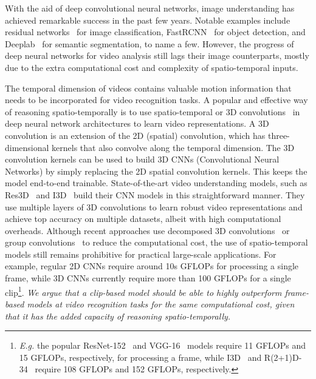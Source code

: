 \documentclass[runningheads]{llncs}
\begin{document}
With the aid of deep convolutional neural networks, image understanding has achieved remarkable success in the past few years. Notable examples include residual networks~\cite{he2016deep} for image classification, FastRCNN~\cite{girshick2015fast} for object detection, and Deeplab~\cite{chen2016deeplab} for semantic segmentation, to name a few. However, the progress of deep neural networks for video analysis still lags their image counterparts, mostly due to the extra computational cost and complexity of spatio-temporal inputs.

The temporal dimension of videos contains valuable motion information that needs to be incorporated for video recognition tasks.
A popular and effective way of reasoning spatio-temporally is to use spatio-temporal or 3D convolutions~\cite{karpathy2014large,tran2015learning} in deep neural network architectures to learn video representations.
A 3D convolution is an extension of the 2D (spatial) convolution, which has three-dimensional kernels that also convolve along the temporal dimension. The 3D convolution kernels can be used to build 3D CNNs (Convolutional Neural Networks) by simply replacing the 2D spatial convolution kernels. This keeps the model end-to-end trainable. State-of-the-art video understanding models, such as Res3D~\cite{tran2015learning} and I3D~\cite{carreira2017quo} build their CNN models in this straightforward manner. They use multiple layers of 3D convolutions to learn robust video representations and achieve top accuracy on multiple datasets, albeit with high computational overheads. Although recent approaches use decomposed 3D convolutions~\cite{tran2017closer,xie2017rethinking} or group convolutions~\cite{hara2018can} to reduce the computational cost, the use of spatio-temporal models still remains  prohibitive for practical large-scale applications. 
For example, regular 2D CNNs require around 10s GFLOPs for processing a single frame, while 3D CNNs currently require more than 100 GFLOPs for a single clip\footnote{\emph{E.g.} the popular ResNet-152~\cite{he2016deep} and VGG-16~\cite{simonyan2014very} models require 11 GFLOPs and 15 GFLOPs, respectively, for processing a frame, while I3D~\cite{carreira2017quo} and R(2+1)D-34~\cite{tran2017closer}  require 108 GFLOPs and 152 GFLOPs, respectively.}. 
\emph{We argue that a clip-based model should be able to highly outperform frame-based models at video recognition tasks for the same computational cost, given that it has the added capacity of reasoning spatio-temporally.}
\nocite{zheng_cvpr16_scnn,zheng_cvpr17_cdc}
\end{document}
